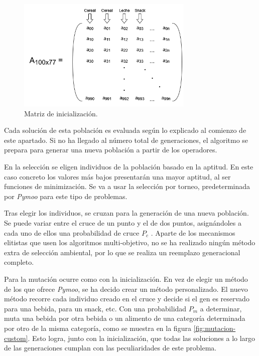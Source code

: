 \begin{figure}[H]
    \centering
    \includegraphics[width=0.75\textwidth]{figures/matriz-inicializacion.png}
    \caption{Matriz de inicialización.}
    \label{fig:matriz-inicializacion}
\end{figure}

Cada solución de esta población es evaluada según lo explicado al comienzo de este apartado. Si no ha llegado al número total de generaciones, el algoritmo se prepara para generar una nueva población a partir de los operadores.

En la selección se eligen individuos de la población basado en la aptitud. En este caso concreto los valores más bajos presentarán una mayor aptitud, al ser funciones de minimización. Se va a usar la selección por torneo, predeterminada por \textit{Pymoo} para este tipo de problemas.

Tras elegir los individuos, se cruzan para la generación de una nueva población.  Se puede variar entre el cruce de un punto y el de dos puntos, asignándoles a cada uno de ellos una probabilidad de cruce \(P_c\)  . Aparte de los mecanismos elitistas que usen los algoritmos multi-objetivo, no se ha realizado ningún método extra de selección ambiental, por lo que se realiza un reemplazo generacional completo.

Para la mutación ocurre como con la inicialización. En vez de elegir un método de los que ofrece \textit{Pymoo}, se ha decido crear un método personalizado. El nuevo método recorre cada individuo creado en el cruce y decide si el gen es reservado para una bebida, para un snack, etc. Con una probabilidad \(P_m\) a determinar, muta una bebida por otra bebida o un alimento de una categoría determinada por otro de la misma categoría, como se muestra en la figura \ref{fig:mutacion-custom}. Esto logra, junto con la inicialización, que todas las soluciones a lo largo de las generaciones cumplan con las peculiaridades de este problema.

